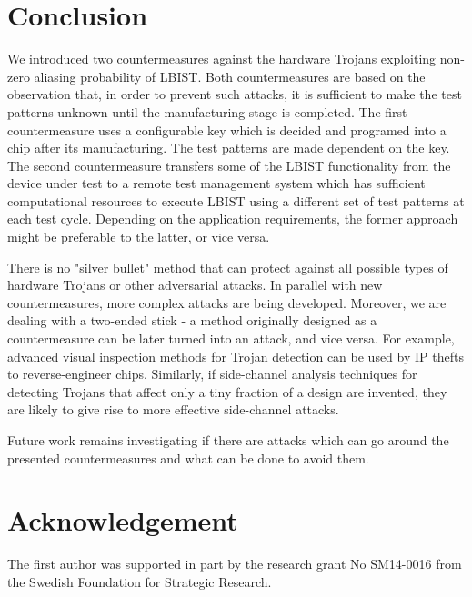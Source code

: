 \documentclass[a4paper]{llncs}
\begin{document}
\section{Conclusion} \label{con} 

We introduced two countermeasures against the hardware Trojans exploiting non-zero aliasing probability of LBIST. Both countermeasures are based on the observation that, in order to prevent such attacks, it is sufficient to make the test patterns unknown until the manufacturing stage is completed. The first countermeasure uses a configurable key which is decided and programed into a chip after its manufacturing. The test patterns are made dependent on the key. 
The second countermeasure transfers some of the LBIST functionality from the device under test to a remote test management system which has sufficient computational resources to execute LBIST using a different set of test patterns at each test cycle. 
Depending on the application requirements, the former approach might be preferable to the latter, or vice versa.



There is no "silver bullet" method that can protect against all possible types of hardware Trojans or other adversarial attacks. In parallel with new countermeasures, more complex attacks are being developed. 
Moreover, we are dealing with a two-ended stick - a method originally designed as a countermeasure can be later turned into an attack, and vice versa.  
For example, advanced visual inspection methods for Trojan detection can be used by IP thefts to reverse-engineer chips.
Similarly, if side-channel analysis techniques for detecting Trojans that affect only a tiny fraction of a design are invented, they are likely to give rise to more effective side-channel attacks.

Future work remains investigating if there are attacks which can go around the presented countermeasures and what can be done to avoid them.

\section*{Acknowledgement}
The first author was supported in part by the research grant No SM14-0016 from the Swedish Foundation for Strategic Research.
 
\end{document}
